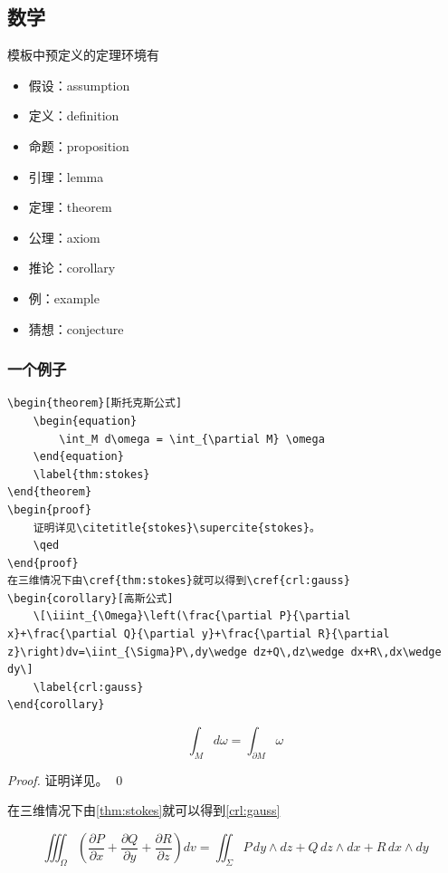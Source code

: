 \documentclass{LZU}
\begin{document}
\subsection{数学}
模板中预定义的定理环境有
\begin{itemize}
    \item 假设：assumption
    \item 定义：definition
    \item 命题：proposition
    \item 引理：lemma
    \item 定理：theorem
    \item 公理：axiom
    \item 推论：corollary
    \item 例：example
    \item 猜想：conjecture
\end{itemize}
\subsubsection{一个例子}
\begin{verbatim}
\begin{theorem}[斯托克斯公式]
    \begin{equation}
        \int_M d\omega = \int_{\partial M} \omega
    \end{equation}
    \label{thm:stokes}
\end{theorem}
\begin{proof}
    证明详见\citetitle{stokes}\supercite{stokes}。
    \qed
\end{proof}
在三维情况下由\cref{thm:stokes}就可以得到\cref{crl:gauss}
\begin{corollary}[高斯公式]
    \[\iiint_{\Omega}\left(\frac{\partial P}{\partial x}+\frac{\partial Q}{\partial y}+\frac{\partial R}{\partial z}\right)dv=\iint_{\Sigma}P\,dy\wedge dz+Q\,dz\wedge dx+R\,dx\wedge dy\]
    \label{crl:gauss}
\end{corollary}
\end{verbatim}

\begin{theorem}[斯托克斯公式]
    \begin{equation}
        \int_M d\omega = \int_{\partial M} \omega
    \end{equation}
    \label{thm:stokes}
\end{theorem}
\begin{proof}
    证明详见\supercite{stokes}。
    \qed
\end{proof}
在三维情况下由\cref{thm:stokes}就可以得到\cref{crl:gauss}
\begin{corollary}[高斯公式]
    \[\iiint_{\Omega}\left(\frac{\partial P}{\partial x}+\frac{\partial Q}{\partial y}+\frac{\partial R}{\partial z}\right)dv=\iint_{\Sigma}P\,dy\wedge dz+Q\,dz\wedge dx+R\,dx\wedge dy\]
    \label{crl:gauss}
\end{corollary}
\end{document}
